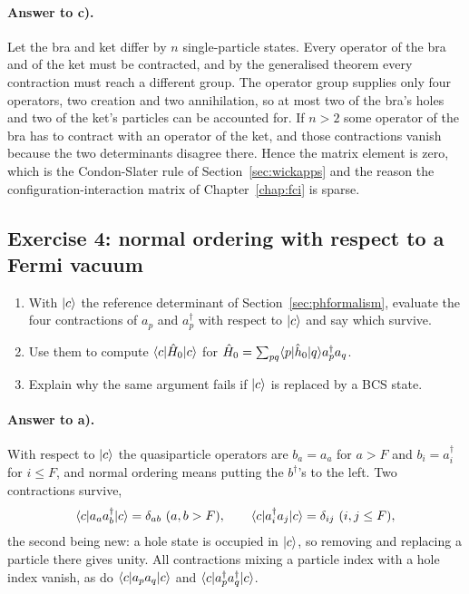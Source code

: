 \paragraph{Answer to c).}
Let the bra and ket differ by $n$ single-particle states.  Every operator of
the bra and of the ket must be contracted, and by the generalised theorem
every contraction must reach a different group.  The operator group supplies
only four operators, two creation and two annihilation, so at most two of the
bra's holes and two of the ket's particles can be accounted for.  If $n>2$
some operator of the bra has to contract with an operator of the ket, and
those contractions vanish because the two determinants disagree there.  Hence
the matrix element is zero, which is the Condon-Slater rule of
Section~\ref{sec:wickapps} and the reason the configuration-interaction
matrix of Chapter~\ref{chap:fci} is sparse.

\subsection*{Exercise 4: normal ordering with respect to a Fermi vacuum}
\label{ex:3-fermivacuum}

\begin{enumerate}
  \item[a)] With $\vert c \rangle$ the reference determinant of
  Section~\ref{sec:phformalism}, evaluate the four contractions of $a_p$ and
  $a_p^{\dagger}$ with respect to $\vert c \rangle$ and say which survive.
  \item[b)] Use them to compute $\langle c | \hat{H}_0 | c \rangle$ for
  $\hat{H}_0=\sum_{pq}\langle p | \hat{h}_0 | q \rangle a_p^{\dagger}a_q$.
  \item[c)] Explain why the same argument fails if $\vert c \rangle$ is replaced by
  a BCS state.
\end{enumerate}

\paragraph{Answer to a).}
With respect to $\vert c \rangle$ the quasiparticle operators are $b_a=a_a$ for
$a>F$ and $b_i=a_i^{\dagger}$ for $i\le F$, and normal ordering means putting
the $b^{\dagger}$'s to the left.  Two contractions survive,
\[
  \bracket{c}{a_aa_b^{\dagger}}{c}=\delta_{ab}\ (a,b>F),
  \qquad
  \bracket{c}{a_i^{\dagger}a_j}{c}=\delta_{ij}\ (i,j\le F),
\]
the second being new: a hole state is occupied in $\vert c \rangle$, so removing and
replacing a particle there gives unity.  All contractions mixing a particle
index with a hole index vanish, as do $\langle c | a_pa_q | c \rangle$ and
$\langle c | a_p^{\dagger}a_q^{\dagger} | c \rangle$.

